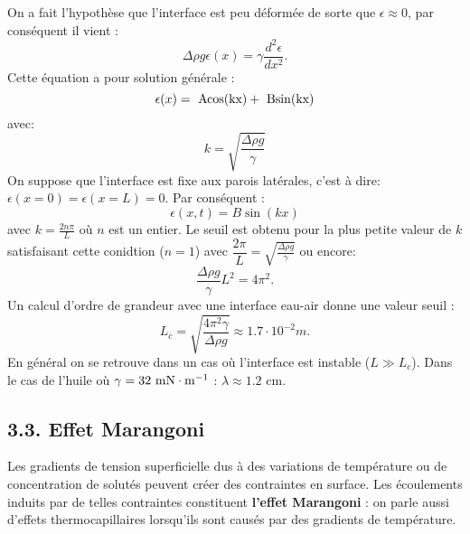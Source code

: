 \documentclass[french, a4paper, 10pt, twocolumn, landscape]{article}
\begin{document}
On a fait l'hypoth{\`e}se que l'interface est peu d{\'e}form{\'e}e de sorte que $\epsilon \approx 0$, par cons{\'e}quent il vient :
\begin{equation} 
  \Delta \rho g \epsilon (x) = \gamma \dfrac{d^2 \epsilon}{d x^2}. 
\end{equation}
Cette {\'e}quation a pour solution g{\'e}n{\'e}rale : 
\begin{equation} 
  \epsilon (x) = \rm~{Acos} (k x) + \rm~{Bsin} (k x) 
\end{equation}
avec:
\begin{equation} 
  k = \sqrt{\dfrac{\Delta \rho g}{\gamma}} 
\end{equation}
On suppose que l'interface est fixe aux parois lat{\'e}rales, c'est {\`a} dire: $\epsilon (x = 0) = \epsilon (x = L) = 0.$ Par cons{\'e}quent :
\begin{equation}
  \epsilon (x, t) = B\sin(k x) 
\end{equation}
avec $k = \frac{2 n \pi}{L}$ o{\`u} $n$ est un entier. Le seuil est obtenu pour
la plus petite valeur de $k$ satisfaisant cette conidtion ($n=1$) avec
$\dfrac{2\pi}{L}={\sqrt{{\frac{{\Delta}{\rho}g}{{\gamma}}}}}$ ou encore:
\begin{equation}
  \dfrac{\Delta \rho g}{\gamma} L^2 = 4 \pi^2. 
\end{equation}
Un calcul d'ordre de grandeur avec une interface eau-air donne une valeur
seuil :
\begin{equation} 
  L_c = \sqrt{\dfrac{4 \pi^2 \gamma}{\Delta \rho g}} \approx 1.7 \cdot 10^{-2} m. 
\end{equation}
En g{\'e}n{\'e}ral on se retrouve dans un cas o{\`u} l'interface est instable
($L \gg L_c$). Dans le cas de l'huile o{\`u} $\gamma = 32 \rm~{mN} \cdot m^{- 1}$ :
$\lambda\approx 1.2$ cm.


\subsection*{3.3. Effet Marangoni}

Les gradients de tension superficielle dus {\`a} des variations de
temp{\'e}rature ou de concentration de solut{\'e}s peuvent cr{\'e}er des
contraintes en surface. Les {\'e}coulements induits par de telles contraintes
constituent \textbf{l'effet Marangoni} : on parle aussi d'effets
thermocapillaires lorsqu'ils sont caus{\'e}s par des gradients de
temp{\'e}rature.

\end{document}
